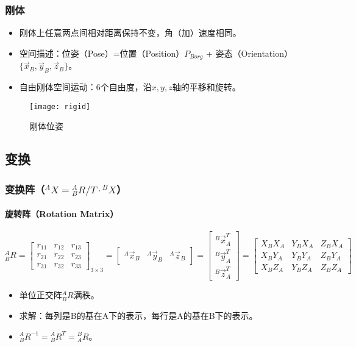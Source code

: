 \documentclass[
12pt, %
a4paper, 
oneside, %
headinclude,footinclude, %
]{scrartcl}
\begin{document}
\subsubsection[刚体]{刚体}
\noindent
\begin{minipage}{0.7\textwidth}
\begin{itemize}
\item 刚体上任意两点间相对距离保持不变，角（加）速度相同。
\item 空间描述：位姿（Pose）=位置（Position）$ P_{Borg} $ + 姿态（Orientation）$ \{\vec x_B, \vec y_B, \vec z_B\} $。
\item 自由刚体空间运动：6个自由度，沿$ x, y, z $轴的平移和旋转。
\end{itemize}
\end{minipage}
\begin{minipage}{0.3\textwidth}
\begin{figure}[H]
\centering 
\texttt{[image: rigid]} 
\caption{刚体位姿}
\end{figure}
\end{minipage}
\subsection[变换]{变换}
\subsubsection[变换阵]{变换阵（$ {}^A X = {}^A_B R/T \cdot {}^B X $）}
\paragraph{旋转阵（Rotation Matrix）}
$$ 
{}^A_B R 
= \begin{bmatrix} r_{11} & r_{12} & r_{13} \\ r_{21} & r_{22} & r_{23} \\ r_{31} & r_{32} & r_{33} \end{bmatrix}_{3 \times 3}
= \begin{bmatrix} {}^A \vec{x}_B & {}^A \vec{y}_B & {}^A \vec{z}_B \end{bmatrix}
= \begin{bmatrix} {}^B \vec{x}_A^T \\ {}^B \vec{y}_A^T \\ {}^B \vec{z}_A^T \end{bmatrix}
= \begin{bmatrix} X_B X_A & Y_B X_A & Z_B X_A \\ X_B Y_A & Y_B Y_A & Z_B Y_A \\ X_B Z_A & Y_B Z_A & Z_B Z_A \end{bmatrix}
$$
\begin{itemize}
\item 单位正交阵$ {}^A_B R $满秩。
\item 求解：每列是B的基在A下的表示，每行是A的基在B下的表示。
\item $ {}^A_B R^{-1} = {}^A_B R^T = {}^B_A R $。
\end{itemize}
\end{document}
